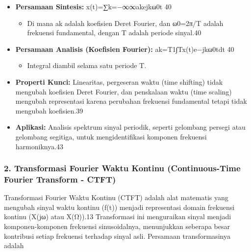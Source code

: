 \documentclass[
  letterpaper,
  DIV=11,
  numbers=noendperiod]{scrreprt}
\providecommand{\tightlist}{%
  \setlength{\itemsep}{0pt}\setlength{\parskip}{0pt}}\usepackage{longtable,booktabs,array}
\begin{document}
\begin{itemize}
\item
  \textbf{Persamaan Sintesis:}
  x(t)=∑k=−∞∞\hspace{0pt}ak\hspace{0pt}ejkω0\hspace{0pt}t 40

  \begin{itemize}
  \tightlist
  \item
    Di mana ak\hspace{0pt} adalah koefisien Deret Fourier, dan
    ω0\hspace{0pt}=2π/T adalah frekuensi fundamental, dengan T adalah
    periode sinyal.40
  \end{itemize}
\item
  \textbf{Persamaan Analisis (Koefisien Fourier):}
  ak\hspace{0pt}=T1\hspace{0pt}∫T\hspace{0pt}x(t)e−jkω0\hspace{0pt}tdt
  40

  \begin{itemize}
  \tightlist
  \item
    Integral diambil selama satu periode T.
  \end{itemize}
\item
  \textbf{Properti Kunci:} Linearitas, pergeseran waktu (time shifting)
  tidak mengubah koefisien Deret Fourier, dan penskalaan waktu (time
  scaling) mengubah representasi karena perubahan frekuensi fundamental
  tetapi tidak mengubah koefisien.39
\item
  \textbf{Aplikasi:} Analisis spektrum sinyal periodik, seperti
  gelombang persegi atau gelombang segitiga, untuk mengidentifikasi
  komponen frekuensi harmoniknya.43
\end{itemize}

\subsubsection{2. Transformasi Fourier Waktu Kontinu (Continuous-Time
Fourier Transform -
CTFT)}\label{transformasi-fourier-waktu-kontinu-continuous-time-fourier-transform---ctft}

Transformasi Fourier Waktu Kontinu (CTFT) adalah alat matematis yang
mengubah sinyal waktu kontinu (f(t)) menjadi representasi domain
frekuensi kontinu (X(jω) atau X(Ω)).13 Transformasi ini menguraikan
sinyal menjadi komponen-komponen frekuensi sinusoidalnya, menunjukkan
seberapa besar kontribusi setiap frekuensi terhadap sinyal asli.
Persamaan transformasinya adalah
\end{document}
